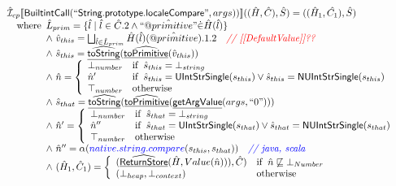 \documentclass{article}
\makeatletter
\newcommand{\SF}[1]{\mbox{\textsf{#1}}}
\newcommand{\comment}[1]{\textit{#1}}
\newcommand{\wherec}[1]{{\rm where}\begin{array}[t]{l}#1\end{array}}
\newcommand{\ifc}[1]{{\rm if}\begin{array}[t]{l}#1\end{array}}
\newcommand{\owc}{{\rm otherwise}}
\newcommand{\aI}{\hat{\mathcal{I}}}
\newcommand{\lbr}{\llbracket}
\newcommand{\rbr}{\rrbracket}
\newcommand{\hf}[1]{\underline{\sf #1}}
\newcommand{\ahf}[1]{\widehat{\underline{\sf #1}}}
\newcommand{\avarprop}[1]{\hat{@#1}}
\def\inred{\color{red}}
\def\inblue{\color{blue}}
\def\inred{\color{red}}
\def\inblue{\color{blue}}
\makeatother
\begin{document}
\[
\begin{array}{l}

\aI _{cp}\lbr \SF{BuiltintCall}(``\SF{String.prototype.localeCompare}",args))\rbr((\hat{H},\hat{C}), \hat{S})
  = ((\hat{H}_1, \hat{C_1}), \hat{S})\\
\quad\wherec{ 
  \hat{L}_{prim} = \{ \hat{l} \mid \hat{l} \in \hat{C}.2 \land ``\avarprop{primitive}" \dot{\in}\hat{H}(\hat{l}) \}\\
  \land\ \hat{v}_{this} = \bigsqcup_{\hat{l} \in \hat{L}_{prim}} \hat{H}(\hat{l})(\avarprop{primitive}).1.2
    \quad\comment{{\inred // [[DefaultValue]]??}}\\
  \land\ \hat{s}_{this} = \ahf{toString}(\ahf{toPrimitive}(\hat{v}_{this}))\\
  \land\ \hat{n} = \left\{\begin{array}{ll}
      \bot_{number} & \ifc{\hat{s}_{this} = \bot_{string}}\\
      \hat{n}' & \ifc{\hat{s}_{this} = \SF{UIntStrSingle}(s_{this}) \lor \hat{s}_{this} = \SF{NUIntStrSingle}(s_{this}) }\\
      \top_{number} & \owc
    \end{array}\right.\\
  \land\ \hat{s}_{that} = \ahf{toString}(\ahf{toPrimitive}(\hf{getArgValue}(args, ``0")))\\  
  \land\ \hat{n}' = \left\{\begin{array}{ll}
      \bot_{number} & \ifc{\hat{s}_{that} = \bot_{string}}\\
      \hat{n}'' & \ifc{\hat{s}_{that} = \SF{UIntStrSingle}(s_{that}) \lor \hat{s}_{that} = \SF{NUIntStrSingle}(s_{that}) }\\
      \top_{number} & \owc
    \end{array}\right.\\
  \land\ \hat{n}'' = \alpha({\inblue native.string.compare}(s_{this}, s_{that}))
    \quad\comment{{\inblue // java, scala}}\\  
  \land\ (\hat{H}_1, \hat{C}_1) = 
    \left\{\begin{array}{ll}
      (\ahf{ReturnStore}(\hat{H}, Value(\hat{n}))), \hat{C})
      & \ifc{\hat{n} \not\sqsubseteq \bot_{Number}}\\
      (\bot_{heap}, \bot_{context}) & \owc \\
    \end{array}\right.
  }\\
\\\\



\end{array}\]
\end{document}
